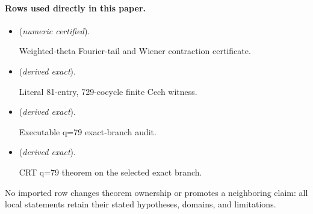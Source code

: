 \documentclass[11pt]{article}
\theoremstyle{definition}
\theoremstyle{remark}
\begin{document}
\paragraph{Rows used directly in this paper.}
\begin{itemize}
\setlength{\itemsep}{0.25em}
\item {} (\emph{numeric certified}).\par Weighted-theta Fourier-tail and Wiener contraction certificate.
\item {} (\emph{derived exact}).\par Literal 81-entry, 729-cocycle finite Cech witness.
\item {} (\emph{derived exact}).\par Executable q=79 exact-branch audit.
\item {} (\emph{derived exact}).\par CRT q=79 theorem on the selected exact branch.
\end{itemize}

No imported row changes theorem ownership or promotes a neighboring claim: all local statements retain their stated hypotheses, domains, and limitations.


\end{document}
